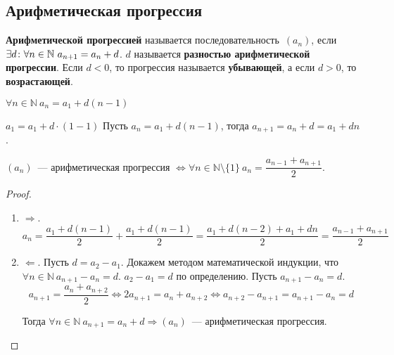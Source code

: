 \subsection{Арифметическая прогрессия}
 \textbf{Арифметической прогрессией} называется последовательность~$(a_n)$, если $\exists d \colon \forall n \in \mathbb N \ a_{n+1} \opbr= a_n + \nobreak d$.
$d$ называется \textbf{разностью арифметической прогрессии}.
Если $d < 0$, то прогрессия называется \textbf{убывающей}, а если $d > 0$, то \textbf{возрастающей}.

\begin{statement}
$\forall n \in \mathbb N \ a_n = a_1 + d(n - 1)$
\end{statement}
\begin{proofmathind}
	\indbase $a_1 = a_1 + d \cdot (1 - 1)$
	\indstep Пусть $a_n = a_1 + d(n - 1)$, тогда $a_{n+1} = a_n + d = a_1 + dn$. \indend
\end{proofmathind}

\begin{theorem}
$(a_n)$~--- арифметическая прогрессия $\Leftrightarrow \forall n \in \mathbb N \setminus \{ 1 \} \ a_n = \dfrac{a_{n-1} + a_{n+1}}2$.
\end{theorem}
\begin{proof}
\begin{enumerate}
	\item $\Rightarrow$.
	\begin{equation*}
	a_n = \frac{a_1 + d(n - 1)}2 + \frac{a_1 + d(n - 1)}2 =
	\frac{a_1 + d(n - 2) + a_1 + dn}2 =
	\frac{a_{n-1} + a_{n+1}}2
	\end{equation*}
	
	\item $\Leftarrow$. Пусть $d = a_2 - a_1$.
	Докажем методом математической индукции, что $\forall n \in \mathbb N \ a_{n+1} - a_n = d$.
		\indbase $a_2 - a_1 = d$ по определению.
		\indstep Пусть $a_{n+1} - a_n = d$.
		\begin{equation*}
		a_{n+1} = \frac{a_n + a_{n+2}}2 \Leftrightarrow
		2 a_{n+1} = a_n + a_{n+2} \Leftrightarrow
		a_{n+2} - a_{n+1} = a_{n+1} - a_n = d
		\end{equation*}
		\indend
		
	Тогда $\forall n \in \mathbb N \ a_{n+1} = a_n + d \Rightarrow (a_n)$~--- арифметическая прогрессия.
\end{enumerate}
\end{proof}

